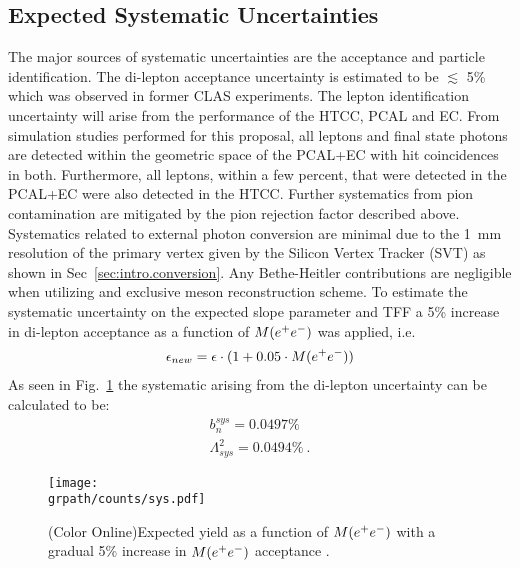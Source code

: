 \subsection{Expected Systematic Uncertainties}
The major sources of systematic uncertainties are the acceptance and particle identification. The di-lepton acceptance uncertainty is estimated to be $\lesssim$ 5\% which was observed in former CLAS experiments. The lepton identification uncertainty will arise from the performance of the HTCC, PCAL and EC. From simulation studies performed for this proposal, all leptons and final state photons are detected within the geometric space of the PCAL+EC with hit coincidences in both. Furthermore, all leptons, within a few percent, that were detected in the PCAL+EC were also detected in the HTCC. Further systematics from pion contamination are mitigated by the pion rejection factor described above. Systematics related to external photon conversion are minimal due to the  1~mm resolution of the primary vertex given by the Silicon Vertex Tracker (SVT) as shown in Sec~\ref{sec:intro.conversion}. Any Bethe-Heitler contributions are negligible when utilizing and exclusive meson reconstruction scheme. To estimate the systematic uncertainty on the expected slope parameter and TFF a 5\% increase in di-lepton acceptance as a function of $M(\epem)$ was applied, i.e.
\begin{align}
\epsilon_{new} = \epsilon \cdot (1+0.05 \cdot M(e^+e^-)) \label{eq:sys} 
\end{align}
As seen in Fig.~\ref{fig:EPEMsys} the systematic arising from the di-lepton uncertainty can be calculated to be:
\begin{align}
b_{n}^{sys} =0.0497 \% \\
\Lambda^{2}_{sys} = 0.0494 \%\ .
\end{align}
\begin{figure}[h!]\begin{center}
		\texttt{[image: \\grpath/counts/sys.pdf]}
		\caption[Acceptance as a function of $M(\epem)$]{\label{fig:EPEMsys}{(Color Online)Expected yield as a function of $M(\epem)$ with a gradual 5\% increase in $M(\epem)$ acceptance .}}
	\end{center}\end{figure}
	\FloatBarrier

